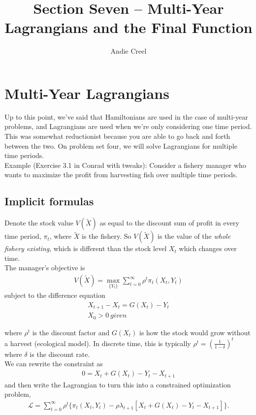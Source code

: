 \documentclass[12pt]{article}
\title{Section Seven -- Multi-Year Lagrangians and the Final Function}
\author{Andie Creel}
\begin{document}
\maketitle

\section{Multi-Year Lagrangians}

Up to this point, we've said that Hamiltonians are used in the case of multi-year problems, and Lagrangians are used when we're only considering one time period. This was somewhat reductionist because you are able to go back and forth between the two. On problem set four, we will solve Lagrangians for multiple time periods. \\

Example (Exercise 3.1 in Conrad with tweaks): Consider a fishery manager who wants to maximize the profit from harvesting fish over multiple time periods. 

\subsection{Implicit formulas}

Denote the stock value $V(\tilde X)$ as equal to the discount sum of profit in every time period, $\pi_t$, where $\tilde X$ is the fishery. So $V(\tilde X)$ is the value of the \textit{whole fishery existing}, which is different than the stock level $X_t$ which changes over time. \\

The manager's objective is 
\begin{align}
    V(\tilde X) = \max_{\{Y_t\}}\sum_{t=0}^\infty \rho^t \pi_t(X_t, Y_t)
\end{align}
subject to the difference equation 
\begin{align}
    X_{t+1} - X_{t} = G(X_t) - Y_t\\
    X_0 > 0 \ given
\end{align}

where $\rho^t$ is the discount factor and $G(X_t)$ is how the stock would grow without a harvest (ecological model). In discrete time, this is typically $\rho^t = (\frac{1}{1 - \delta})^t$ where $\delta$ is the discount rate. \\

We can rewrite the constraint as 
\begin{align}
    0 = X_t +G(X_t) - Y_t - X_{t+1}
\end{align}
and then write the Lagrangian to turn this into a constrained optimization problem, 
\begin{align}
    \mathcal{L} = \sum_{t=0}^\infty \rho^t \Big\{ \pi_t(X_t, Y_t) - \rho \lambda_{t+1} [X_t +G(X_t) - Y_t - X_{t+1}] \Big\}.
\end{align}
\end{document}
